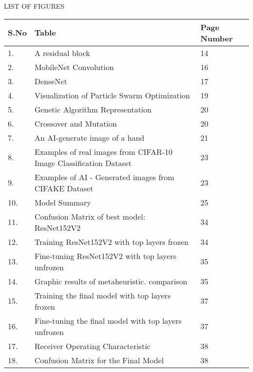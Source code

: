 \thispagestyle{plain}

\section*{}
\begin{center}
\large \large {LIST OF FIGURES}
\end{center}


\begin{table}[H]
\begin{tabular}{|l|l|l|}
\hline
S.No & Table                         & Page Number \\ \hline
1.   & A residual block     & 14          \\ \hline
2.   & MobileNet Convolution    & 16          \\ \hline
3.   & DenseNet      & 17          \\ \hline
4.   & Visualization of Particle Swarm Optimization                 & 19         \\ \hline
5.   & Genetic Algorithm Representation    & 20         \\ \hline
6.   & Crossover and Mutation         & 20          \\ \hline
7.   & An AI-generate image of a hand             & 21          \\ \hline
8.   & Examples of real images from CIFAR-10 Image Classification Dataset                 & 23         \\ \hline
9.   & Examples of AI - Generated images from CIFAKE Dataset                & 23         \\ \hline
10.   & Model Summary                 & 25          \\ \hline
11.   & Confusion Matrix of best model: ResNet152V2              & 34          \\ \hline
12.   & Training ResNet152V2 with top layers frozen                 & 34         \\ \hline
13.   & Fine-tuning ResNet152V2 with top layers unfrozen           & 35         \\ \hline
14.   & Graphic results of metaheuristic. comparison               & 35          \\ \hline
15.   & Training the final model with top layers frozen             & 37          \\ \hline
16.   & Fine-tuning the final model with top layers unfrozen                 & 37          \\ \hline
17.   & Receiver Operating Characteristic & 38          \\ \hline
18.   & Confusion Matrix for the Final Model   & 38          \\ \hline

\end{tabular}
\end{table}
